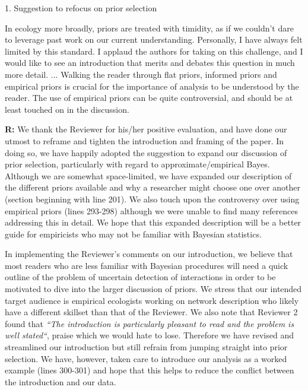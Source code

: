 \documentclass[12pt]{letter}
\newenvironment{refquote}{\bigskip \begin{it}}{\end{it}\smallskip}
\begin{document}
	1. Suggestion to refocus on prior selection

		\begin{refquote}
			In ecology more broadly, priors are treated with timidity, as if we couldn't dare to leverage past work on our current understanding. Personally, I have always felt limited by this standard. I applaud the authors for taking on this challenge, and I would like to see an introduction that merits and debates this question in much more detail. ... Walking the reader through flat priors, informed priors and empirical priors is crucial for the importance of analysis to be understood by the reader. The use of empirical priors can be quite controversial, and should be at least touched on in the discussion. 
			\end{refquote}


		\textbf{R:} We thank the Reviewer for his/her positive evaluation, and have done our utmost to reframe and tighten the introduction and framing of the paper. In doing so, we have happily adopted the suggestion to expand our discussion of prior selection, particularly with regard to approximate/empirical Bayes. Although we are somewhat space-limited, we have expanded our description of the different priors available and why a researcher might choose one over another (section beginning with line 201). We also touch upon the controversy over using empirical priors (lines 293-298) although we were unable to find many references addressing this in detail. We hope that this expanded description will be a better guide for empiricists who may not be familiar with Bayesian statistics.


		In implementing the Reviewer's comments on our introduction, we believe that most readers who are less familiar with Bayesian procedures will need a quick outline of the problem of uncertain detection of interactions in order to be motivated to dive into the larger discussion of priors. We stress that our intended target audience is empirical ecologists working on network description who likely have a different skillset than that of the Reviewer. We also note that Reviewer 2 found that \emph{``The introduction is particularly pleasant to read and the problem is well stated``}, praise which we would hate to lose. Therefore we have revised and streamlined our introduction but still refrain from jumping straight into prior selection. We have, however, taken care to introduce our analysis as a worked example (lines 300-301) and hope that this helps to reduce the conflict between the introduction and our data. 
\end{document}
